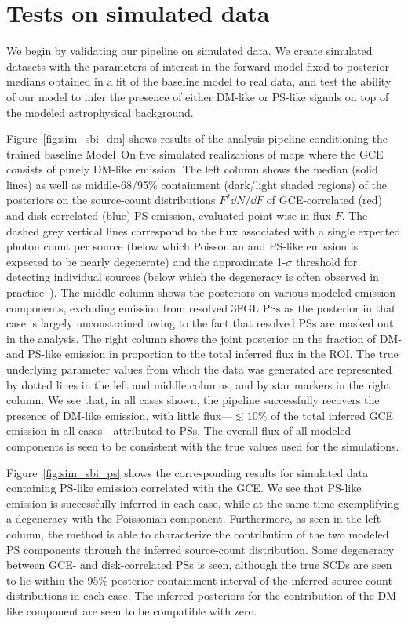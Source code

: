 \documentclass[prd,aps,10pt,nofootinbib,twocolumn,superscriptaddress,preprintnumbers,balancelastpage,longbibliography,floatfix]{revtex4-2}
\begin{document}
\section{Tests on simulated data}
\label{sec:simulations}

We begin by validating our pipeline on simulated \Fermi data. We create simulated datasets with the parameters of interest in the forward model fixed to posterior medians obtained in a fit of the baseline model to real \Fermi data, and test the ability of our model to infer the presence of either DM-like or PS-like signals on top of the modeled astrophysical background.

Figure~\ref{fig:sim_sbi_dm} shows results of the analysis pipeline conditioning the trained baseline {Model~O}n five simulated realizations of maps where the GCE consists of purely DM-like emission. The left column shows the median (solid lines) as well as middle-68/95\% containment (dark/light shaded regions) of the posteriors on the source-count distributions $F^2 \dd N/\dd F$ of GCE-correlated (red) and disk-correlated (blue) PS emission, evaluated point-wise in flux $F$. The dashed grey vertical lines correspond to the flux associated with a single expected photon count per source (below which Poissonian and PS-like emission is expected to be nearly degenerate) and the approximate 1-$\sigma$ threshold for detecting individual sources (below which the degeneracy is often observed in practice~\cite{Chang:2019ars,Buschmann:2020adf}). The middle column shows the posteriors on various modeled emission components, excluding emission from resolved 3FGL PSs as the posterior in that case is largely unconstrained owing to the fact that resolved PSs are masked out in the analysis. The right column shows the joint posterior on the fraction of DM- and PS-like emission in proportion to the total inferred flux in the ROI. The true underlying parameter values from which the data was generated are represented by dotted lines in the left and middle columns, and by star markers in the right column. We see that, in all cases shown, the pipeline successfully recovers the presence of DM-like emission, with little flux---$\lesssim 10\%$ of the total inferred GCE emission in all cases---attributed to PSs. 
The overall flux of all modeled components is seen to be consistent with the true values used for the simulations.

Figure~\ref{fig:sim_sbi_ps} shows the corresponding results for simulated data containing PS-like emission correlated with the GCE. We see that PS-like emission is successfully inferred in each case, while at the same time exemplifying a degeneracy with the Poissonian component. Furthermore, as seen in the left column, the method is able to characterize the contribution of the two modeled PS components through the inferred source-count distribution. Some degeneracy between GCE- and disk-correlated PSs is seen, although the true SCDs are seen to lie within the 95\% posterior containment interval of the inferred source-count distributions in each case. The inferred posteriors for the contribution of the DM-like component are seen to be compatible with zero.
\end{document}
